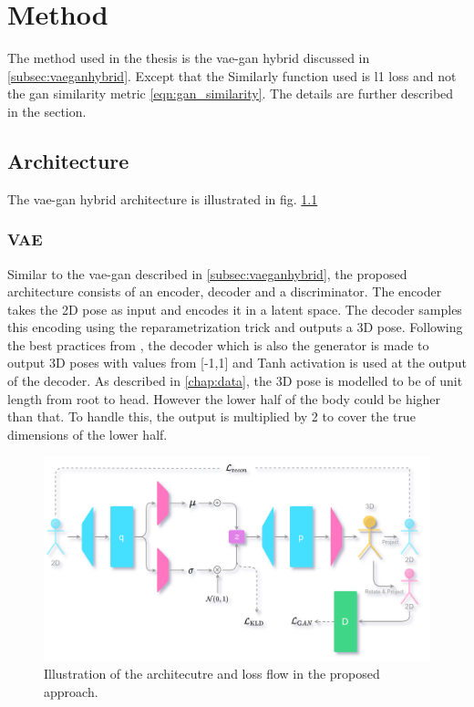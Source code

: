 \chapter{Method}

The method used in the thesis is the \ac{vae}-\ac{gan} hybrid discussed in \ref{subsec:vaeganhybrid}. Except that the Similarly function used is \ac{l1} loss and not the \ac{gan} similarity metric \ref{eqn:gan_similarity}. The details are further described in the section.

\section{Architecture}

The \ac{vae}-\ac{gan} hybrid architecture is illustrated in fig. \ref{fig:method_arch}

\subsection{VAE} 
Similar to the \ac{vae}-\ac{gan} described in \ref{subsec:vaeganhybrid}, the proposed architecture consists of an encoder, decoder and a discriminator. The encoder takes the 2D pose as input and encodes it in a latent space. The decoder samples this encoding using the reparametrization trick and outputs a 3D pose. Following the best practices from \cite{soumith2017wasserstein}, the decoder which is also the generator is made to output 3D poses with values from [-1,1] and Tanh activation is used at the output of the decoder. As described in \ref{chap:data}, the 3D pose is modelled to be of unit length from root to head. However the lower half of the body could be higher than that. To handle this, the output is multiplied by 2 to cover the true dimensions of the lower half.

\begin{figure}[!h]
    \centering
    \includegraphics[scale=0.2]{figures/arch/method_arch.png}
    \caption{Illustration of the architecutre and loss flow in the proposed approach. }
    \label{fig:method_arch}
\end{figure}



